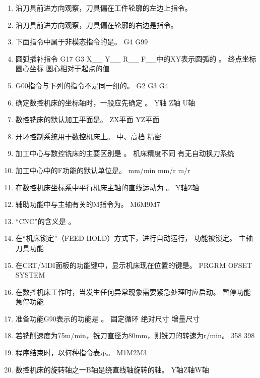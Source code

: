 \documentclass[12pt,twocolumn,landscape,UTF8,twoside]{ctexart}
\begin{document}
\begin{spacing}{1.3}
\begin{enumerate} [1、]
\item 沿刀具前进方向观察，刀具偏在工件轮廓的左边上指令。
\item 沿刀具前进方向观察，刀具偏在轮廓的右边是指令。
\item 下面指令中属于非模态指令的是。
	{G4}	{G99}
\item 圆弧插补指令 G17 G3 X\_\_ Y\_\_ R\_\_ F\_\_中的XY表示圆弧的	。
	{终点坐标}	{圆心坐标}	{圆心相对于起点的值}
\item G00指令与下列的指令不是同一组的。
		{G2}	{G3}	{G4}
\item 确定数控机床的坐标轴时，一般应先确定	。
	{Y轴} {Z轴}		{U轴}
\item 数控铣床的默认加工平面是。
		{ZX平面}		{YZ平面}		
\item 开环控制系统用于数控机床上。
		{中、高档}		{精密}
\item 加工中心与数控铣床的主要区别是	。
	{机床精度不同}	{有无自动换刀系统}
\item 加工中心中的F功能的默认单位是。
	{mm/min}	{mm/r}	{m/r}
\item 在数控机床坐标系中平行机床主轴的直线运动为	。
	{Y轴}{Z轴}
\item 辅助功能中与主轴有关的M指令为。
 {M6}{M9}{M7}
\item “CNC”的含义是	。
\item 在“机床锁定”（FEED HOLD）方式下，进行自动运行，	功能被锁定。
	{主轴} {刀具功能}
\item 在CRT/MDI面板的功能键中，显示机床现在位置的键是。
	{PRGRM}	{OFSET}	{SYSTEM}
\item 在数控机床工作时，当发生任何异常现象需要紧急处理时应启动。
	{暂停功能}	{急停功能}
\item 准备功能G90表示的功能是	。
	{固定循环}	{绝对尺寸}	{增量尺寸}
\item 若铣削速度为75m/min，铣刀直径为80mm，则铣刀的转速为r/min。
	{358}	{398}
\item 程序结束时，以何种指令表示。
	{M1}{M2}{M3}
\item 数控机床的旋转轴之一B轴是绕直线轴旋转的轴。
	{Y轴}{Z轴}{W轴}

\end{enumerate}
\end{spacing}
\end{document}
